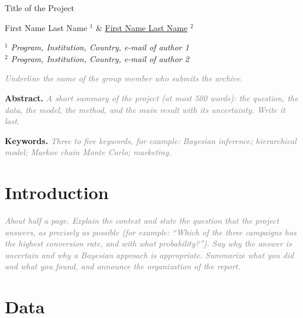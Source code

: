 \documentclass[12pt]{article}
\newcommand{\guide}[1]{\textit{\textcolor{gray}{#1}}}
\begin{document}

\begin{center}
{\Large
	{\sc Title of the Project}
}
\bigskip

First Name Last Name $^{1}$ \& \underline{First Name Last Name} $^{2}$
\bigskip

{\it
$^{1}$ Program, Institution, Country, e-mail of author 1\\
$^{2}$ Program, Institution, Country, e-mail of author 2
}
\end{center}
\guide{Underline the name of the group member who submits the archive.}
\bigskip


{\bf Abstract.} \guide{A short summary of the project (at most 500 words): the question, the data, the model, the method, and the main result with its uncertainty. Write it last.}

{\bf Keywords.} \guide{Three to five keywords, for example: Bayesian inference; hierarchical model; Markov chain Monte Carlo; marketing.}

\bigskip\bigskip

\section{Introduction}\label{sec:introduction}

\guide{About half a page. Explain the context and state the question that the project answers, as precisely as possible (for example: ``Which of the three campaigns has the highest conversion rate, and with what probability?''). Say why the answer is uncertain and why a Bayesian approach is appropriate. Summarize what you did and what you found, and announce the organization of the report.}

\section{Data}\label{sec:data}
\end{document}
